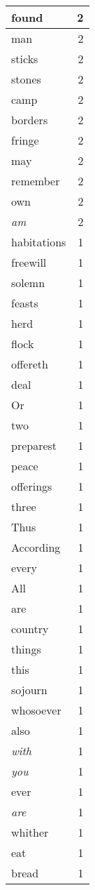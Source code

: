 \begin{center}
\begin{longtable}{l|r}
found & 2 \\ \hline
man & 2 \\ \hline
sticks & 2 \\ \hline
stones & 2 \\ \hline
camp & 2 \\ \hline
borders & 2 \\ \hline
fringe & 2 \\ \hline
may & 2 \\ \hline
remember & 2 \\ \hline
own & 2 \\ \hline
\emph{am} & 2 \\ \hline
habitations & 1 \\ \hline
freewill & 1 \\ \hline
solemn & 1 \\ \hline
feasts & 1 \\ \hline
herd & 1 \\ \hline
flock & 1 \\ \hline
offereth & 1 \\ \hline
deal & 1 \\ \hline
Or & 1 \\ \hline
two & 1 \\ \hline
preparest & 1 \\ \hline
peace & 1 \\ \hline
offerings & 1 \\ \hline
three & 1 \\ \hline
Thus & 1 \\ \hline
According & 1 \\ \hline
every & 1 \\ \hline
All & 1 \\ \hline
are & 1 \\ \hline
country & 1 \\ \hline
things & 1 \\ \hline
this & 1 \\ \hline
sojourn & 1 \\ \hline
whosoever & 1 \\ \hline
also & 1 \\ \hline
\emph{with} & 1 \\ \hline
\emph{you} & 1 \\ \hline
ever & 1 \\ \hline
\emph{are} & 1 \\ \hline
whither & 1 \\ \hline
eat & 1 \\ \hline
bread & 1 \\ \hline

\end{longtable}
\end{center}
